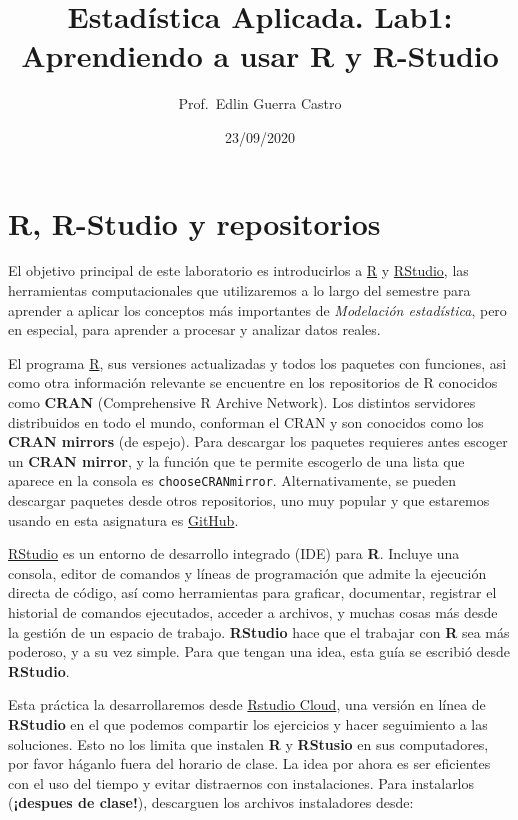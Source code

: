 \documentclass[
]{article}
\title{Estadística Aplicada. Lab1: Aprendiendo a usar R y R-Studio}
\author{Prof.~Edlin Guerra Castro}
\date{23/09/2020}
\begin{document}
\maketitle

\hypertarget{r-r-studio-y-repositorios}{%
\section{R, R-Studio y repositorios}\label{r-r-studio-y-repositorios}}

El objetivo principal de este laboratorio es introducirlos a
\href{https://www.r-project.org/}{R} y
\href{https://rstudio.com/}{RStudio}, las herramientas computacionales
que utilizaremos a lo largo del semestre para aprender a aplicar los
conceptos más importantes de \emph{Modelación estadística}, pero en
especial, para aprender a procesar y analizar datos reales.

El programa \href{https://www.r-project.org/}{R}, sus versiones
actualizadas y todos los paquetes con funciones, asi como otra
información relevante se encuentre en los repositorios de R conocidos
como \textbf{CRAN} (Comprehensive R Archive Network). Los distintos
servidores distribuidos en todo el mundo, conforman el CRAN y son
conocidos como los \textbf{CRAN mirrors} (de espejo). Para descargar los
paquetes requieres antes escoger un \textbf{CRAN mirror}, y la función
que te permite escogerlo de una lista que aparece en la consola es
\texttt{chooseCRANmirror}. Alternativamente, se pueden descargar
paquetes desde otros repositorios, uno muy popular y que estaremos
usando en esta asignatura es \href{https://github.com/}{GitHub}.

\href{https://rstudio.com/}{RStudio} es un entorno de desarrollo
integrado (IDE) para \textbf{R}. Incluye una consola, editor de comandos
y líneas de programación que admite la ejecución directa de código, así
como herramientas para graficar, documentar, registrar el historial de
comandos ejecutados, acceder a archivos, y muchas cosas más desde la
gestión de un espacio de trabajo. \textbf{RStudio} hace que el trabajar
con \textbf{R} sea más poderoso, y a su vez simple. Para que tengan una
idea, esta guía se escribió desde \textbf{RStudio}.

Esta práctica la desarrollaremos desde
\href{https://rstudio.cloud/}{Rstudio Cloud}, una versión en línea de
\textbf{RStudio} en el que podemos compartir los ejercicios y hacer
seguimiento a las soluciones. Esto no los limita que instalen \textbf{R}
y \textbf{RStusio} en sus computadores, por favor háganlo fuera del
horario de clase. La idea por ahora es ser eficientes con el uso del
tiempo y evitar distraernos con instalaciones. Para instalarlos
(\textbf{¡despues de clase!}), descarguen los archivos instaladores
desde:
\end{document}
